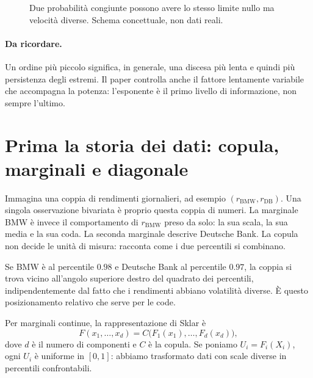 \documentclass[11pt,a4paper]{article}
\newcommand{\Ricorda}{\paragraph{Da ricordare.}}
\begin{document}
\begin{figure}[ht]
\centering
{}
\caption{Due probabilità congiunte possono avere lo stesso limite nullo ma velocità diverse. Schema concettuale, non dati reali.}
\label{fig:decadimenti}
\end{figure}

\Ricorda Un ordine più piccolo significa, in generale, una discesa più lenta e
quindi più persistenza degli estremi. Il paper controlla anche il fattore
lentamente variabile che accompagna la potenza: l'esponente è il primo livello
di informazione, non sempre l'ultimo.

\section{Prima la storia dei dati: copula, marginali e diagonale}

Immagina una coppia di rendimenti giornalieri, ad esempio
$(r_{\mathrm{BMW}},r_{\mathrm{DB}})$. Una singola osservazione bivariata è
proprio questa coppia di numeri. La marginale BMW è invece il comportamento di
$r_{\mathrm{BMW}}$ preso da solo: la sua scala, la sua media e la sua coda. La
seconda marginale descrive Deutsche Bank. La copula non decide le unità di
misura: racconta come i due percentili si combinano.

Se BMW è al percentile $0.98$ e Deutsche Bank al percentile $0.97$, la coppia
si trova vicino all'angolo superiore destro del quadrato dei percentili,
indipendentemente dal fatto che i rendimenti abbiano volatilità diverse. È
questo posizionamento relativo che serve per le code.

Per marginali continue, la rappresentazione di Sklar è
\begin{equation}
 F(x_1,\ldots,x_d)=C\bigl(F_1(x_1),\ldots,F_d(x_d)\bigr),
 \label{eq:sklar}
\end{equation}
dove $d$ è il numero di componenti e $C$ è la copula. Se poniamo
$U_i=F_i(X_i)$, ogni $U_i$ è uniforme in $[0,1]$: abbiamo trasformato dati con
scale diverse in percentili confrontabili.
\end{document}
